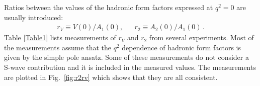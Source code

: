 Ratios between the values of the hadronic form factors expressed at $q^2=0$ are usually introduced:
\begin{eqnarray}
r_V \equiv V(0) / A_1(0), & &  r_2 \equiv A_2(0) / A_1(0) \label{rVr2_eq}\,.
\end{eqnarray}
Table \ref{Table1} lists measurements of $r_V$ and $r_2$ from several
experiments. Most of the measurements assume that the $q^2$ dependence of hadronic form factors 
is given by the simple pole ansatz. Some of these measurements do not consider a S-wave contribution and it is 
included in the measured values. 
The measurements are plotted in Fig.~\ref{fig:r2rv} which shows that they are all consistent.

